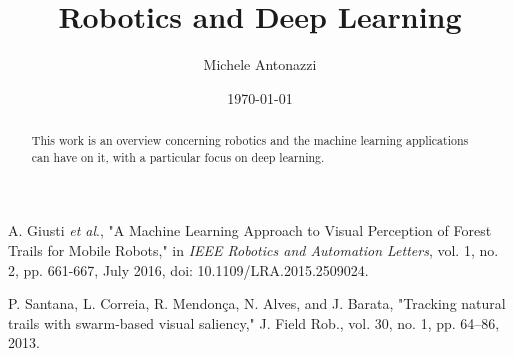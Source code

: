 \documentclass[letterpaper,12pt]{article}
\begin{document}
\title{Robotics and Deep Learning}
\author{Michele Antonazzi}
\date{\today}
\maketitle

\begin{abstract}
This work is an overview concerning robotics and the machine learning applications can have on it, with a particular focus on deep learning.  
\end{abstract}


\newpage


\newpage
\begin{thebibliography}{99}

\bibitem{}
A. Giusti \emph{et al}., "A Machine Learning Approach to Visual
Perception of Forest Trails for Mobile Robots," in \emph{IEEE Robotics
	and Automation Letters}, vol. 1, no. 2, pp. 661-667, July 2016, doi:
10.1109/LRA.2015.2509024.

\bibitem{}
P. Santana, L. Correia, R. Mendonça, N. Alves, and J. Barata,
"Tracking natural trails with swarm-based visual saliency," J. Field
Rob., vol. 30, no. 1, pp. 64--86, 2013.

\end{thebibliography}
\end{document}
